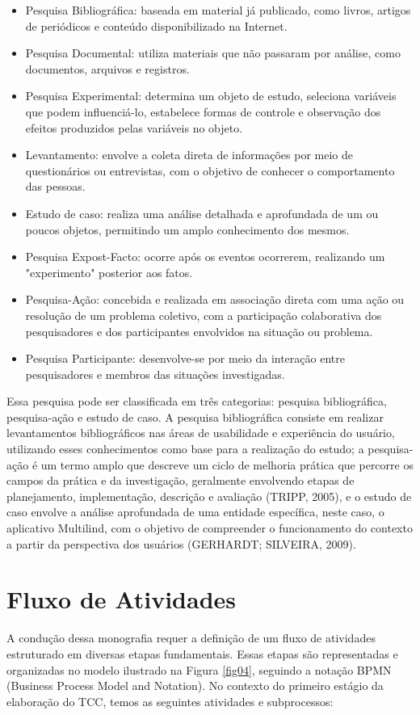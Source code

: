 \begin{itemize}
	\item Pesquisa Bibliográfica: baseada em material já publicado, como livros, artigos de periódicos e conteúdo disponibilizado na Internet.
	\item Pesquisa Documental: utiliza materiais que não passaram por análise, como documentos, arquivos e registros.
	\item Pesquisa Experimental: determina um objeto de estudo, seleciona variáveis que podem influenciá-lo, estabelece formas de controle e observação dos efeitos produzidos pelas variáveis no objeto.
	\item Levantamento: envolve a coleta direta de informações por meio de questionários ou entrevistas, com o objetivo de conhecer o comportamento das pessoas.
	\item Estudo de caso: realiza uma análise detalhada e aprofundada de um ou poucos objetos, permitindo um amplo conhecimento dos mesmos.
	\item Pesquisa Expost-Facto: ocorre após os eventos ocorrerem, realizando um "experimento" posterior aos fatos.
	\item Pesquisa-Ação: concebida e realizada em associação direta com uma ação ou resolução de um problema coletivo, com a participação colaborativa dos pesquisadores e dos participantes envolvidos na situação ou problema.
	\item Pesquisa Participante: desenvolve-se por meio da interação entre pesquisadores e membros das situações investigadas.
\end{itemize}

Essa pesquisa pode ser classificada em três categorias: pesquisa bibliográfica, pesquisa-ação e estudo de caso. A pesquisa bibliográfica consiste em realizar levantamentos bibliográficos nas áreas de usabilidade e experiência do usuário, 
utilizando esses conhecimentos como base para a realização do estudo; a pesquisa-ação é um termo amplo que descreve um ciclo de melhoria prática que percorre os campos da prática e da investigação, geralmente envolvendo etapas de planejamento, 
implementação, descrição e avaliação (TRIPP, 2005), e o estudo de caso envolve a análise aprofundada de uma entidade específica, neste caso, o aplicativo Multilind, com o objetivo de compreender o funcionamento do contexto a partir da perspectiva 
dos usuários (GERHARDT; SILVEIRA, 2009).

\section{Fluxo de Atividades}
\label{sec:Fluxo de Atividades}
A condução dessa monografia requer a definição de um fluxo de atividades estruturado em diversas etapas fundamentais. Essas etapas são representadas e organizadas no modelo ilustrado na Figura \ref{fig04}, seguindo a notação BPMN (Business Process Model and Notation). 
No contexto do primeiro estágio da elaboração do TCC, temos as seguintes atividades e subprocessos:

